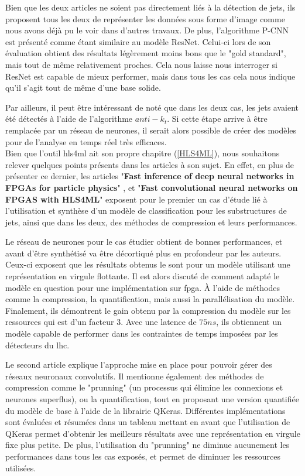 Bien que les deux articles ne soient pas directement liés à la détection de jets, ils proposent tous les deux de représenter les données sous forme d'image comme nous avons déjà pu le voir dans d'autres travaux. De plus, l'algorithme P-CNN est présenté comme étant similaire au modèle ResNet. Celui-ci lors de son évaluation obtient des résultats légèrement moins bons que le "gold standard", mais tout de même relativement proches. Cela nous laisse nous interroger si ResNet est capable de mieux performer, mais dans tous les cas cela nous indique qu'il s'agit tout de même d'une base solide.

Par ailleurs, il peut être intéressant de noté que dans les deux cas, les jets avaient été détectés à l'aide de l'algorithme $anti-k_t$. Si cette étape arrive à être remplacée par un réseau de neurones, il serait alors possible de créer des modèles pour de l'analyse en temps réel très efficaces.\\

Bien que l'outil \acrshort{hls4ml} ait son propre chapitre (\ref{HLS4ML}), nous souhaitons relever quelques points présents dans les articles à son sujet. En effet, en plus de présenter ce dernier, les articles "\textbf{Fast inference of deep neural networks in FPGAs for particle physics}" \cite{duarte_fast_2018}, et "\textbf{Fast convolutional neural networks on FPGAS with HLS4ML}" \cite{aarrestad_fast_2021} exposent pour le premier un cas d'étude lié à l'utilisation et synthèse d'un modèle de classification pour les substructures de jets, ainsi que dans les deux, des méthodes de compression et leurs performances.

Le réseau de neurones pour le cas étudier obtient de bonnes performances, et avant d'être synthétisé va être décortiqué plus en profondeur par les auteurs. Ceux-ci exposent que les résultats obtenus le sont pour un modèle utilisant une représentation en virgule flottante. Il est alors discuté de comment adapté le modèle en question pour une implémentation sur \acrshort{fpga}. À l'aide de méthodes comme la compression, la quantification, mais aussi la parallélisation du modèle. Finalement, ils démontrent le gain obtenu par la compression du modèle sur les ressources qui est d'un facteur $3$. Avec une latence de $75 ns$, ils obtiennent un modèle capable de performer dans les contraintes de temps imposées par les détecteurs du \acrshort{lhc}.

Le second article explique l'approche mise en place pour pouvoir gérer des réseaux neuronaux convolutifs. Il mentionne également des méthodes de compression comme le "prunning" (un processus qui élimine les connexions et neurones superflus), ou la quantification, tout en proposant une version quantifiée du modèle de base à l'aide de la librairie QKeras. Différentes implémentations sont évaluées et résumées dans un tableau mettant en avant que l'utilisation de QKeras permet d'obtenir les meilleurs résultats avec une représentation en virgule fixe plus petite. De plus, l'utilisation du "prunning" ne diminue aucunement les performances dans tous les cas exposés, et permet de diminuer les ressources utilisées.

